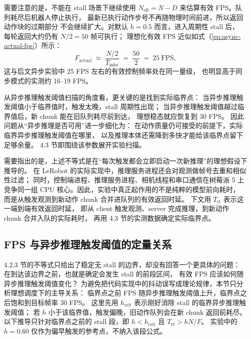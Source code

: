 需要注意的是，不能在 stall 场景下继续使用
$N_{\text{eff}}=N-D$ 来估算有效 FPS。队列耗尽后机器人停止执行，
最新已执行动作步号不再随物理时间前进，所以返回动作块的过期部分
不会继续扩大。对默认 $h=0.5$ 而言，进入周期性 stall 后，
每轮返回大约仍有 $N/2=50$ 帧可执行；
理想化有效 FPS 近似如式（\ref{eq:async-actual-fps}）所示：
\begin{equation}
  F_{\text{actual}} \;\approx\; \frac{N/2}{T_{\text{infer}}}
  \;=\; \frac{50}{2} \;=\; 25\ \text{FPS},
  \label{eq:async-actual-fps}
\end{equation}
这与后文异步实验中 25 FPS 左右的有效控制频率处在同一量级，
也明显高于同步模式的实测约 16--19 FPS。

从异步推理触发阈值扫描的角度看，更关键的是找到实际临界点：
当异步推理触发阈值小于临界值时，触发太晚，stall 周期性出现；
当异步推理触发阈值越过临界值后，新 chunk 能在旧队列耗尽前到达，
理想稳态就应恢复到 30 FPS。
因此问题从``异步推理是否可用''进一步细化为：
在动作质量仍可接受的前提下，实际临界异步推理触发阈值在哪里，
以及推理本体还需降到多快才能给该临界点留下足够余量。
4.3 节即围绕该参数展开实验扫描。

需要指出的是，上述不等式是在``每次触发都会立即启动一次新推理''的理想假设下推导的。
在 LeRobot 的实际实现中，推理服务进程还会对观测做帧号去重和相似性过滤；
同时，控制端进程、推理服务进程、相机线程和串口通信在树莓派 5
上竞争同一组 CPU 核心。因此，实验中真正起作用的不是纯粹的模型前向耗时，
而是从触发观测到新动作 chunk 合并进队列的有效返回时延。
下文用 $T_{\text{rt}}$ 表示这一端到端有效返回时延，
即从 client 触发观测、server 完成推理，到新动作 chunk 合并入队的实际耗时，
再用 4.3 节的实测数据确定实际临界点。

\subsection{FPS 与异步推理触发阈值的定量关系}\label{sec:async-inf-fps-hold}

4.2.3 节的不等式只给出了稳定无 stall 的边界，却没有回答一个更具体的问题：
在到达该边界之前，也就是确定会发生 stall 的前段区间，
有效 FPS 应该如何随异步推理触发阈值变化？
为避免把代码实现中的抖动误写成理论规律，本节只分析理想调度下的主导关系：
临界点之前 FPS 随异步推理触发阈值上升，临界点之后饱和到目标帧率 30 FPS。
这里先用 $h_{\text{crit}}$ 表示刚好消除 stall 的临界异步推理触发阈值；
若 $h$ 小于该临界值，触发偏晚，旧动作队列会在新 chunk 返回前耗尽。
以下推导只针对临界点之前的 stall 段，即
$h<h_{\text{crit}}$ 且 $T_{\text{rt}}>hN/F$。
实验中的 $h=0.60$ 仅作为偏早触发的参考点，不纳入该段公式。

